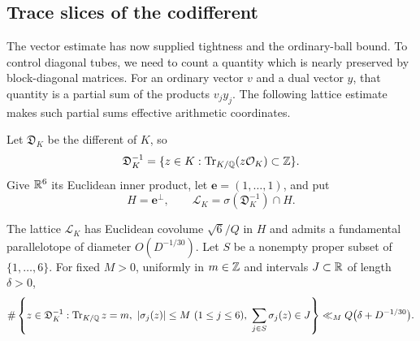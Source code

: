 \subsection{Trace slices of the codifferent}

The vector estimate has now supplied tightness and the ordinary-ball
bound.  To control diagonal tubes, we need to count a quantity which
is nearly preserved by block-diagonal matrices.  For an ordinary
vector $v$ and a dual vector $y$, that quantity is a partial sum of
the products $v_jy_j$.  The following lattice estimate makes such
partial sums effective arithmetic coordinates.

Let $\mathfrak D_K$ be the different of $K$, so
\[
 \mathfrak D_K^{-1}
 =\{z\in K:\operatorname{Tr}_{K/\mathbb Q}(z\mathcal O_K)\subset\mathbb Z\}.
\]
Give $\mathbb R^6$ its Euclidean inner product, let
$\mathbf e=(1,\ldots,1)$, and put
\[
 H=\mathbf e^\perp,
 \qquad \mathcal L_K=\sigma(\mathfrak D_K^{-1})\cap H.
\]

\begin{lemma}\label{lem:trace-slice}
The lattice $\mathcal L_K$ has Euclidean covolume $\sqrt6/Q$ in
$H$ and admits a fundamental parallelotope of diameter
$O(D^{-1/30})$.  Let $S$ be a nonempty proper subset of
$\{1,\ldots,6\}$.  For fixed $M>0$, uniformly in $m\in\mathbb Z$ and
intervals $J\subset\mathbb R$ of length $\delta>0$,
\begin{equation}
 \#\left\{z\in\mathfrak D_K^{-1}:
     \operatorname{Tr}_{K/\mathbb Q}z=m,
     \ |\sigma_j(z)|\le M\ (1\le j\le6),
     \ \sum_{j\in S}\sigma_j(z)\in J\right\}
 \ll_M Q\bigl(\delta+D^{-1/30}\bigr).
                                                        \label{eq:trace-slice-count}
\end{equation}
\end{lemma}

